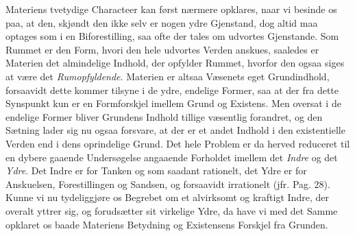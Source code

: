 \documentclass[12pt]{book}
\newcommand{\anm}[1]{\emph{\textbf{Anm.~#1.}}}
\newcommand{\opage}[1]{\marginnote{\footnotesize\textit{[#1]}}}
\begin{document}
Materiens tvetydige Characteer kan først nærmere opklares, naar vi besinde os paa, at den,
skjøndt den ikke selv er nogen ydre Gjenstand, dog altid maa optages som i en Biforestilling,
saa ofte der tales om udvortes Gjenstande. Som Rummet er den Form, hvori den hele udvortes
Verden anskues, saaledes er Materien det almindelige Indhold, der opfylder Rummet, hvorfor den
ogsaa siges at være det \emph{Rumopfyldende}. Materien er altsaa Væsenets eget Grundindhold,
forsaavidt dette kommer tilsyne i de ydre, endelige Former, saa at der fra dette Synspunkt kun
er en Formforskjel imellem Grund og Existens. Men oversat i de endelige Former bliver Grundens
Indhold tillige væsentlig forandret, og den Sætning lader sig nu ogsaa forsvare, at der er et
andet Indhold i den existentielle Verden end i dens oprindelige Grund. Det hele Problem er da
herved reduceret til en dybere gaaende Undersøgelse angaaende Forholdet imellem det
\emph{Indre} og det \emph{Ydre}. Det Indre er for Tanken og som saadant rationelt, det Ydre
\opage{137} %
er for Anskuelsen, Forestillingen og Sandsen, og forsaavidt irrationelt (jfr. Pag. 28). Kunne vi
nu tydeliggjøre os Begrebet om et alvirksomt og kraftigt Indre, der overalt yttrer sig, og
forudsætter sit virkelige Ydre, da have vi med det Samme opklaret os baade Materiens Betydning
og Existensens Forskjel fra Grunden.
\end{document}
